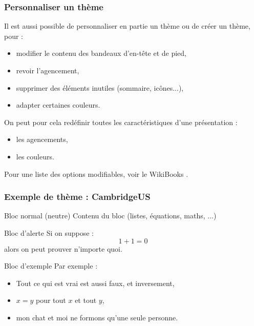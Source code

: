 \begin{frame}[fragile]
  \frametitle{Personnaliser un thème}

Il est aussi possible de personnaliser en partie un thème ou de créer un thème, pour :
\begin{itemize}
  \item modifier le contenu des bandeaux d'en-tête et de pied,
  \item revoir l'agencement,
  \item supprimer des éléments inutiles (sommaire, icônes...),
  \item adapter certaines couleurs.
\end{itemize}

\bigskip
On peut pour cela redéfinir toutes les caractéristiques d'une présentation :
\begin{itemize}
  \item les agencements,
  \item les couleurs.
\end{itemize}

\bigskip
Pour une liste des options modifiables, voir le WikiBooks \cite{wikibooksbeamer}.
\end{frame}



\begin{frame}[fragile]
  \frametitle{Exemple de thème : CambridgeUS}

\begin{block}{Bloc normal (neutre)}
  Contenu du bloc (listes, équations, maths, ...)
\end{block}

\begin{alertblock}{Bloc d'alerte}
  Si on suppose :
  \begin{equation}
    1+1=0
  \end{equation}
  alors on peut prouver n'importe quoi.
\end{alertblock}

\begin{exampleblock}{Bloc d'exemple}
  Par exemple :
  \begin{itemize}
    \item Tout ce qui est vrai est aussi faux, et inversement,
    \item $x = y$ pour tout $x$ et tout $y$,
    \item mon chat et moi ne formons qu'une seule personne.
  \end{itemize}
\end{exampleblock}
\end{frame}



